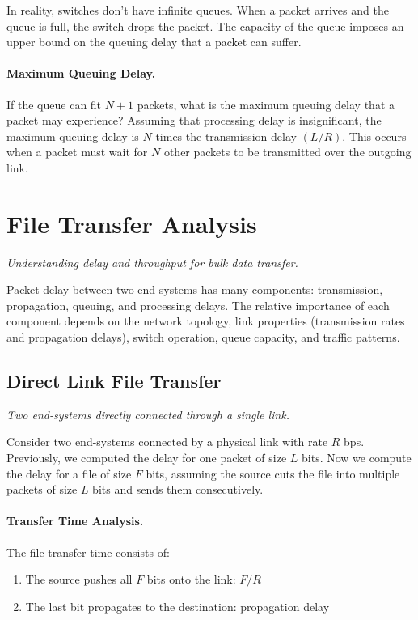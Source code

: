\documentclass[../../compsys.tex]{subfiles}
\begin{document}
In reality, switches don't have infinite queues. When a packet arrives and the queue is full, the switch drops the packet. The capacity of the queue imposes an upper bound on the queuing delay that a packet can suffer.

\paragraph{Maximum Queuing Delay.} If the queue can fit $N+1$ packets, what is the maximum queuing delay that a packet may experience? Assuming that processing delay is insignificant, the maximum queuing delay is $N$ times the transmission delay $(L/R)$. This occurs when a packet must wait for $N$ other packets to be transmitted over the outgoing link.
\newpage
\section{File Transfer Analysis}
\textit{Understanding delay and throughput for bulk data transfer.}

Packet delay between two end-systems has many components: transmission, propagation, queuing, and processing delays. The relative importance of each component depends on the network topology, link properties (transmission rates and propagation delays), switch operation, queue capacity, and traffic patterns.

\subsection{Direct Link File Transfer}
\textit{Two end-systems directly connected through a single link.}

Consider two end-systems connected by a physical link with rate $R$ bps. Previously, we computed the delay for one packet of size $L$ bits. Now we compute the delay for a file of size $F$ bits, assuming the source cuts the file into multiple packets of size $L$ bits and sends them consecutively.

\paragraph{Transfer Time Analysis.} The file transfer time consists of:
\begin{enumerate}
  \item The source pushes all $F$ bits onto the link: $F/R$
  \item The last bit propagates to the destination: propagation delay
\end{enumerate}
\end{document}
